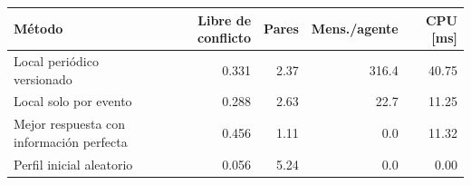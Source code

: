\begin{tabular}{lrrrr}
\toprule
Método & Libre de conflicto & Pares & Mens./agente & CPU [ms] \\
\midrule
Local periódico versionado & 0.331 & 2.37 & 316.4 & 40.75 \\
Local solo por evento & 0.288 & 2.63 & 22.7 & 11.25 \\
Mejor respuesta con información perfecta & 0.456 & 1.11 & 0.0 & 11.32 \\
Perfil inicial aleatorio & 0.056 & 5.24 & 0.0 & 0.00 \\
\bottomrule
\end{tabular}
